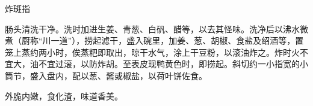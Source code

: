 \begin{recipe}{炸斑指}

\ingredients


\cooking

肠头清洗干净。洗时加进生姜、青葱、白矾、醋等，以去其怪味。洗净后以沸水微煮（厨称“川一道”），捞起滤干，盛入碗里，加姜、葱、胡椒、食盐及绍酒等，置笼上蒸约两小时，俟蒸粑即取出，晾干水气，涂上干豆粉，以滚油炸之。炸时火不宜大，油不宜过滚，以防炸胡。至表皮现鸭黄色时，即捞起。斜切约一小指宽的小筒节，盛入盘内，配以葱、酱或椒盐，以荷叶饼佐食。

\notes

外脆内嫩，食化渣，味道香美。

\end{recipe}

